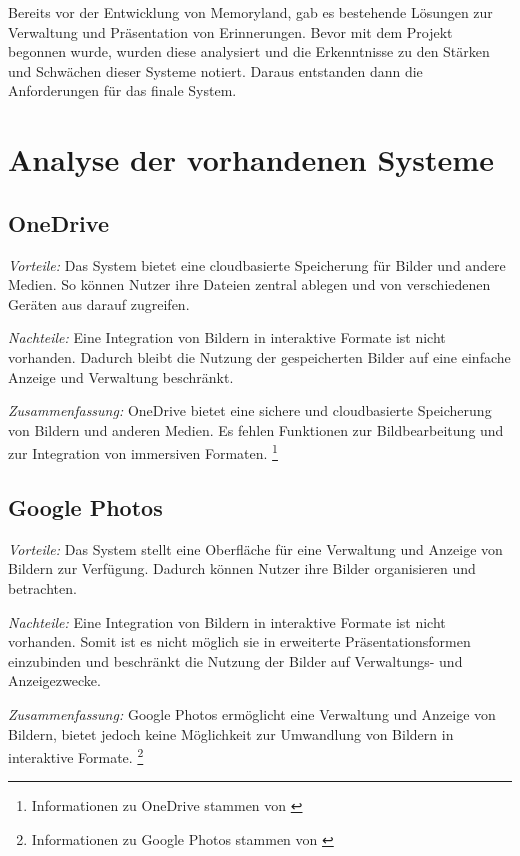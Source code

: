 Bereits vor der Entwicklung von Memoryland, gab es bestehende Lösungen zur Verwaltung
und Präsentation von Erinnerungen. Bevor mit dem Projekt begonnen wurde, wurden
diese analysiert und die Erkenntnisse zu den Stärken und Schwächen dieser Systeme
notiert. Daraus entstanden dann die Anforderungen für das finale System.

\section{Analyse der vorhandenen Systeme}

\subsection{OneDrive}

\emph{Vorteile:}
Das System bietet eine cloudbasierte Speicherung für Bilder und andere Medien. 
So können Nutzer ihre Dateien zentral ablegen und von verschiedenen Geräten aus darauf 
zugreifen.

\emph{Nachteile:}
Eine Integration von Bildern in interaktive Formate ist nicht vorhanden. 
Dadurch bleibt die Nutzung der gespeicherten Bilder auf eine einfache 
Anzeige und Verwaltung beschränkt.

\emph{Zusammenfassung:}
OneDrive bietet eine sichere und cloudbasierte Speicherung von Bildern und anderen 
Medien. Es fehlen Funktionen zur Bildbearbeitung und zur Integration von 
immersiven Formaten. \footnote{Informationen zu OneDrive stammen von \cite{MicrosoftCorporation}}

\subsection{Google Photos}

\emph{Vorteile:}
Das System stellt eine Oberfläche für eine Verwaltung und Anzeige von Bildern 
zur Verfügung. Dadurch können Nutzer ihre Bilder organisieren und betrachten.

\emph{Nachteile:}
Eine Integration von Bildern in interaktive Formate ist nicht vorhanden. 
Somit ist es nicht möglich sie in erweiterte Präsentationsformen einzubinden 
und beschränkt die Nutzung der Bilder auf Verwaltungs- und Anzeigezwecke.

\emph{Zusammenfassung:}
Google Photos ermöglicht eine Verwaltung und Anzeige von Bildern, bietet jedoch 
keine Möglichkeit zur Umwandlung von Bildern in interaktive Formate. \footnote{Informationen zu Google Photos stammen von \cite{GoogleIrelandLimited}}

